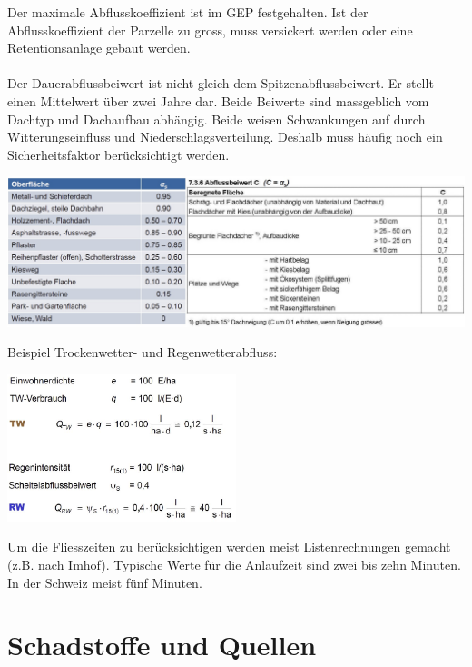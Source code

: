 \documentclass[9pt, openright=false]{scrartcl}
\begin{document}
Der maximale Abflusskoeffizient ist im GEP festgehalten. Ist der Abflusskoeffizient der Parzelle zu gross, muss versickert werden oder eine Retentionsanlage gebaut werden.\\ \\
Der Dauerabflussbeiwert ist nicht gleich dem Spitzenabflussbeiwert. Er stellt einen Mittelwert über zwei Jahre dar. Beide Beiwerte sind massgeblich vom Dachtyp und Dachaufbau abhängig. Beide weisen Schwankungen auf durch Witterungseinfluss und Niederschlagsverteilung. Deshalb muss häufig noch ein Sicherheitsfaktor berücksichtigt werden.
\begin{center}
\includegraphics[width=\textwidth]{images/beiwerte}
\end{center}\par 
Beispiel Trockenwetter- und Regenwetterabfluss:
\begin{center}
\includegraphics[width=0.5\textwidth]{images/BeispielBilanz}
\end{center}
Um die Fliesszeiten zu berücksichtigen werden meist Listenrechnungen gemacht (z.B. nach Imhof). Typische Werte für die Anlaufzeit sind zwei bis zehn Minuten. In der Schweiz meist fünf Minuten.
\section{Schadstoffe und Quellen}
\end{document}
